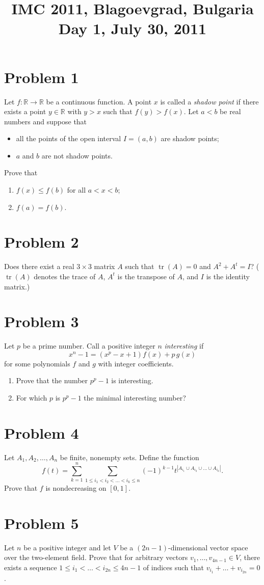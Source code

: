 \documentclass{article}
\title{IMC 2011, Blagoevgrad, Bulgaria \\ Day 1, July 30, 2011}
\date{}
\begin{document}
\maketitle

\section*{Problem 1}
Let $f : \mathbb{R} \to \mathbb{R}$ be a continuous function. A point $x$ is called a \emph{shadow point} if there exists a point $y \in \mathbb{R}$ with $y > x$ such that $f(y) > f(x)$. Let $a < b$ be real numbers and suppose that
\begin{itemize}
  \item all the points of the open interval $I = (a, b)$ are shadow points;
  \item $a$ and $b$ are not shadow points.
\end{itemize}
Prove that
\begin{enumerate}
  \item[a)] $f(x) \le f(b)$ for all $a < x < b$;
  \item[b)] $f(a) = f(b)$.
\end{enumerate}

\section*{Problem 2}
Does there exist a real $3 \times 3$ matrix $A$ such that $\operatorname{tr}(A) = 0$ and $A^2 + A^t = I$? ($\operatorname{tr}(A)$ denotes the trace of $A$, $A^t$ is the transpose of $A$, and $I$ is the identity matrix.)

\section*{Problem 3}
Let $p$ be a prime number. Call a positive integer $n$ \emph{interesting} if
\[
x^n - 1 = (x^p - x + 1)f(x) + p\, g(x)
\]
for some polynomials $f$ and $g$ with integer coefficients.
\begin{enumerate}
  \item[a)] Prove that the number $p^p - 1$ is interesting.
  \item[b)] For which $p$ is $p^p - 1$ the minimal interesting number?
\end{enumerate}

\section*{Problem 4}
Let $A_1, A_2, \ldots, A_n$ be finite, nonempty sets. Define the function
\[
f(t) = \sum_{k=1}^{n} \sum_{1 \le i_1 < i_2 < \ldots < i_k \le n} (-1)^{k-1} t^{|A_{i_1} \cup A_{i_2} \cup \ldots \cup A_{i_k}|}.
\]
Prove that $f$ is nondecreasing on $[0, 1]$.

\section*{Problem 5}
Let $n$ be a positive integer and let $V$ be a $(2n-1)$-dimensional vector space over the two-element field. Prove that for arbitrary vectors $v_1, \ldots, v_{4n-1} \in V$, there exists a sequence $1 \le i_1 < \ldots < i_{2n} \le 4n-1$ of indices such that $v_{i_1} + \ldots + v_{i_{2n}} = 0$.
\end{document}
